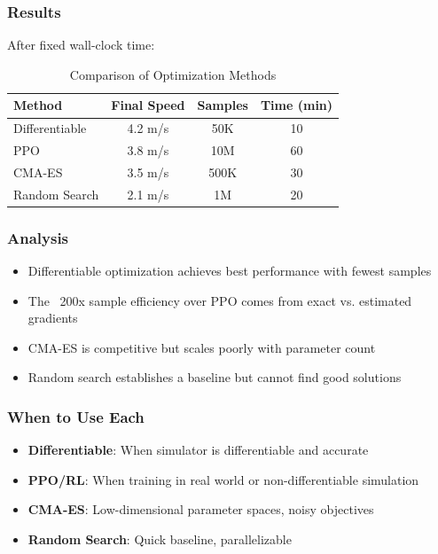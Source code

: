 \subsubsection{Results}

After fixed wall-clock time:

\begin{table}[htbp]
\centering
\caption{Comparison of Optimization Methods}
\label{tab:opt_comparison}
\begin{tabular}{lccc}
\toprule
\textbf{Method} & \textbf{Final Speed} & \textbf{Samples} & \textbf{Time (min)} \\
\midrule
Differentiable & 4.2 m/s & 50K & 10 \\
PPO & 3.8 m/s & 10M & 60 \\
CMA-ES & 3.5 m/s & 500K & 30 \\
Random Search & 2.1 m/s & 1M & 20 \\
\bottomrule
\end{tabular}
\end{table}

\subsubsection{Analysis}

\begin{itemize}
    \item Differentiable optimization achieves best performance with fewest samples
    \item The ~200x sample efficiency over PPO comes from exact vs. estimated gradients
    \item CMA-ES is competitive but scales poorly with parameter count
    \item Random search establishes a baseline but cannot find good solutions
\end{itemize}

\subsubsection{When to Use Each}

\begin{itemize}
    \item \textbf{Differentiable}: When simulator is differentiable and accurate
    \item \textbf{PPO/RL}: When training in real world or non-differentiable simulation
    \item \textbf{CMA-ES}: Low-dimensional parameter spaces, noisy objectives
    \item \textbf{Random Search}: Quick baseline, parallelizable
\end{itemize}

